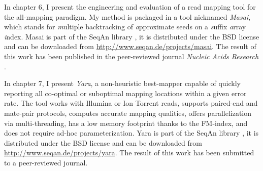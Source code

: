 In chapter 6, I present the engineering and evaluation of a read mapping tool for the all-mapping paradigm.
My method is packaged in a \CC tool nicknamed \emph{Masai}, which stands for \emph{m}ultiple backtracking of \emph{a}pproximate seeds on a \emph{s}uffix \emph{a}rray \emph{i}ndex.
Masai is part of the SeqAn library \citep{Doering2008}, it is distributed under the BSD license and can be downloaded from \url{http://www.seqan.de/projects/masai}.
The result of this work has been published in the peer-reviewed journal \emph{Nucleic Acids Research} \citep{Siragusa2013}.

In chapter 7, I present \emph{Yara}, a non-heuristic best-mapper capable of quickly reporting all co-optimal or suboptimal mapping locations within a given error rate.
The tool works with Illumina or Ion Torrent reads, supports paired-end and mate-pair protocols, computes accurate mapping qualities, offers parallelization via multi-threading, has a low memory footprint thanks to the FM-index, and does not require ad-hoc parameterization.
Yara is part of the SeqAn library \citep{Doering2008}, it is distributed under the BSD license and can be downloaded from \url{http://www.seqan.de/projects/yara}.
The result of this work has been submitted to a peer-reviewed journal.


